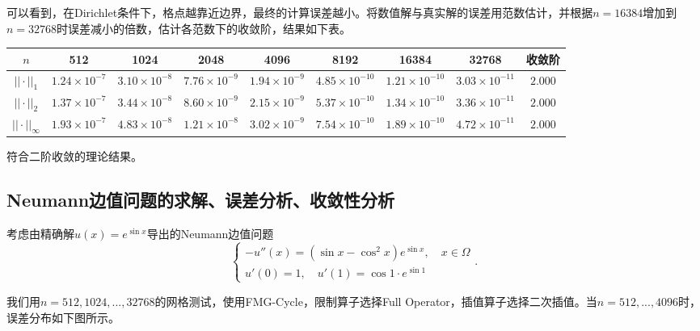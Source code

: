\documentclass[lang=cn,10pt]{elegantbook}
\begin{document}
可以看到，在Dirichlet条件下，格点越靠近边界，最终的计算误差越小。将数值解与真实解的误差用范数估计，并根据$n=16384$增加到$n=32768$时误差减小的倍数，估计各范数下的收敛阶，结果如下表。

\begin{table}[H]
  \centering
  \small
  \begin{tabular}{c|ccccccc|c}
  \textbf{$n$}        & 512                 & 1024                 & 2048                 & 4096                 & 8192                 & 16384                & 32768                & 收敛阶 \\ \hline
  $||\cdot||_1$      & $1.24\times 10^{-7}$ & $3.10\times 10^{-8}$ & $7.76\times 10^{-9}$ & $1.94\times 10^{-9}$ & $4.85\times 10^{-10}$ & $1.21\times 10^{-10}$ & $3.03\times 10^{-11}$ & $2.000$\\
  $||\cdot||_2$      & $1.37\times 10^{-7}$ & $3.44\times 10^{-8}$ & $8.60\times 10^{-9}$ & $2.15\times 10^{-9}$ & $5.37\times 10^{-10}$ & $1.34\times 10^{-10}$ & $3.36\times 10^{-11}$ & $2.000$\\
  $||\cdot||_\infty$ & $1.93\times 10^{-7}$ & $4.83\times 10^{-8}$ & $1.21\times 10^{-8}$ & $3.02\times 10^{-9}$ & $7.54\times 10^{-10}$ & $1.89\times 10^{-10}$ & $4.72\times 10^{-11}$ & $2.000$
  \end{tabular}
\end{table}

符合二阶收敛的理论结果。

\subsection{Neumann边值问题的求解、误差分析、收敛性分析}

考虑由精确解$u(x)=e^{\sin x}$导出的Neumann边值问题
\begin{equation}
  \left\{
    \begin{array}{l}
      -u''(x) = (\sin x-\cos^2 x)e^{\sin x},\quad x\in\Omega \\
      u'(0)=1,\quad u'(1)=\cos 1\cdot e^{\sin 1}
    \end{array}
  \right. .
\end{equation}

我们用$n=512,1024,...,32768$的网格测试，使用FMG-Cycle，限制算子选择Full Operator，插值算子选择二次插值。当$n=512,...,4096$时，误差分布如下图所示。
\end{document}
